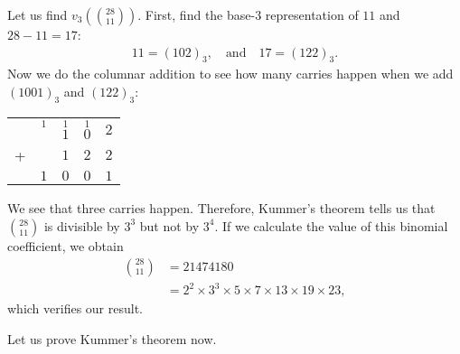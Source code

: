 \documentclass[12pt]{subfile}
\begin{document}
\begin{example}
	Let us find $v_3\left( \binom{28}{11}\right)$. First, find the base-$3$ representation of $11$ and $28-11=17$:
		\begin{align*}
			11 = (102)_3, \quad \text{and} \quad 17 = (122)_3.
		\end{align*}
	Now we do the columnar addition to see how many carries happen when we add $(1001)_3$ and $(122)_3$:
		\begin{center}
			\begin{tabular}{c*{4}{@{\,}c}}
				 &  $\overset{1}{\phantom{1}}$   & $\overset{1}{1}$ & $\overset{1}{0}$ & $2$\\
				+& 		& $1$				   & $2$ 			  	  & $2$\\ \hline
				 & $1$	& $0$				   & $0$ 			      & $1$\\
			\end{tabular}
		\end{center}
	We see that three carries happen. Therefore, Kummer's theorem tells us that $\binom{28}{11}$ is divisible by $3^3$ but not by $3^4$. If we calculate the value of this binomial coefficient, we obtain
		\begin{align*}
			\binom{28}{11} &= 21474180\\
						   &= 2^2 \times 3^3 \times 5 \times 7 \times 13 \times 19 \times 23,
		\end{align*}
	which verifies our result.

Let us prove Kummer's theorem now.

\end{example}
\end{document}
